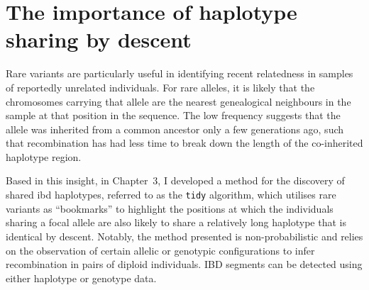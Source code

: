 


%
\section{The importance of haplotype sharing by descent}
%

Rare variants are particularly useful in identifying recent relatedness in samples of reportedly unrelated individuals.
For rare alleles, it is likely that the chromosomes carrying that allele are the nearest genealogical neighbours in the sample at that position in the sequence.
The low frequency suggests that the allele was inherited from a common ancestor only a few generations ago, such that recombination has had less time to break down the length of the co-inherited haplotype region.

Based in this insight, in Chapter~3, I developed a method for the discovery of shared \gls{ibd} haplotypes, referred to as the \texttt{tidy} algorithm, which utilises rare variants as ``bookmarks'' to highlight the positions at which the individuals sharing a focal allele are also likely to share a relatively long haplotype that is identical by descent.
Notably, the method presented is non-probabilistic and relies on the observation of certain allelic or genotypic configurations to infer recombination in pairs of diploid individuals.
IBD segments can be detected using either haplotype or genotype data.

